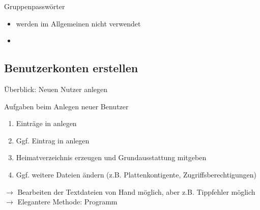 \documentclass[aspectratio=43]{beamer}
\begin{document}
\begin{frame}{}
  \begin{block}{Gruppenpasswörter}
    \begin{itemize}
      \item werden im Allgemeinen nicht verwendet
      \item {}
    \end{itemize}
  \end{block}
\end{frame}

\subsection{Benutzerkonten erstellen}
\begin{frame}{Überblick: Neuen Nutzer anlegen}

  \begin{block}{Aufgaben beim Anlegen neuer Benutzer}
    \begin{enumerate}
      \item Einträge in  anlegen
      \item Ggf. Eintrag in  anlegen
      \item Heimatverzeichnis erzeugen und Grundausstattung mitgeben
      \item Ggf. weitere Dateien ändern (z.B. Plattenkontigente, Zugriffsberechtigungen)
    \end{enumerate}
  \end{block}
  $\rightarrow$ Bearbeiten der Textdateien von Hand möglich, aber z.B. Tippfehler möglich\\
  $\rightarrow$ Elegantere Methode: Programm 
\end{frame}
\end{document}
